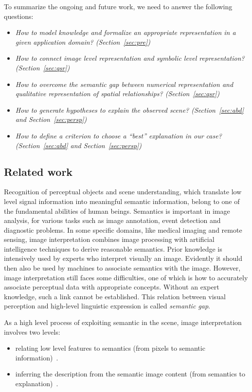 \documentclass{article}
\begin{document}
To summarize the ongoing and future work, we need to answer the following questions:
\begin{itemize}
 \item \textit{How to model knowledge and formalize an appropriate representation in a given application domain? (Section~\ref{sec:pre})}
 \item \textit{How to connect image level representation and symbolic level representation? (Section~\ref{sec:qsr})}
 \item \textit{How to overcome the semantic gap between numerical representation and qualitative representation of spatial relationships? (Section~\ref{sec:qsr})}
 \item \textit{How to generate hypotheses to explain the observed scene? (Section~\ref{sec:abd} and Section~\ref{sec:persp})}
 \item \textit{How to define a criterion to choose a ``best'' explanation in our case? (Section~\ref{sec:abd} and Section~\ref{sec:persp})}
\end{itemize}

 \subsection{Related work}
Recognition of perceptual objects and scene understanding, which translate low level signal information into meaningful semantic information, belong to one of the fundamental abilities of human beings.
Semantics is important in image analysis, for various tasks such as image annotation, event detection and diagnostic problems.
In some specific domains, like medical imaging and remote sensing, image interpretation combines image processing with artificial intelligence techniques to derive reasonable semantics.  
Prior knowledge is intensively used by experts who interpret visually an image. Evidently it should then also be used by machines to associate semantics with the image.  
However, image interpretation still faces some difficulties, one of which is how to accurately associate perceptual data with appropriate concepts. Without an expert knowledge,
such a link cannot be established. This relation between visual perception and high-level linguistic expression is called \textit{semantic gap}.


As a high level process of exploiting semantic in the scene, image interpretation involves two levels:
\begin{itemize}
 \item relating low level features to semantics (from pixels to semantic information)~\cite{Bloch2005fuzzy,fouquier2012sequential,Hudelot2008fuzzy,nempont2013constraint}.
 \item inferring the description from the semantic image content (from semantics to explanation)~\cite{atif2014explanatory,Espinosa07multimedia}.
\end{itemize}
\end{document}

